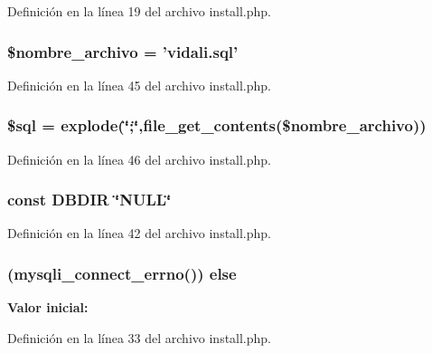 Definición en la línea 19 del archivo install.\-php.

\hypertarget{install_8php_a83ccf54bab13094a0759c863e0e0ba08}{
\subsubsection[{\$nombre\-\_\-archivo}]{\setlength{\rightskip}{0pt plus 5cm}\$nombre\-\_\-archivo = 'vidali.\-sql'}}\label{install_8php_a83ccf54bab13094a0759c863e0e0ba08}


Definición en la línea 45 del archivo install.\-php.

\hypertarget{install_8php_a047170d6020a882807665812a27e2525}{
\subsubsection[{\$sql}]{\setlength{\rightskip}{0pt plus 5cm}\$sql = explode(\char`\"{};\char`\"{},file\-\_\-get\-\_\-contents(\$nombre\-\_\-archivo))}}\label{install_8php_a047170d6020a882807665812a27e2525}


Definición en la línea 46 del archivo install.\-php.

\hypertarget{install_8php_a66b4f44012d5c8f42e66b2bd34cf973b}{
\subsubsection[{D\-B\-D\-I\-R}]{\setlength{\rightskip}{0pt plus 5cm}const D\-B\-D\-I\-R \char`\"{}N\-U\-L\-L\char`\"{}}}\label{install_8php_a66b4f44012d5c8f42e66b2bd34cf973b}


Definición en la línea 42 del archivo install.\-php.

\hypertarget{install_8php_a3d26c003999243f5a76e294d38107fec}{
\subsubsection[{else}]{ (mysqli\-\_\-connect\-\_\-errno()) else}}\label{install_8php_a3d26c003999243f5a76e294d38107fec}
{\bfseries Valor inicial\-:}


Definición en la línea 33 del archivo install.\-php.

